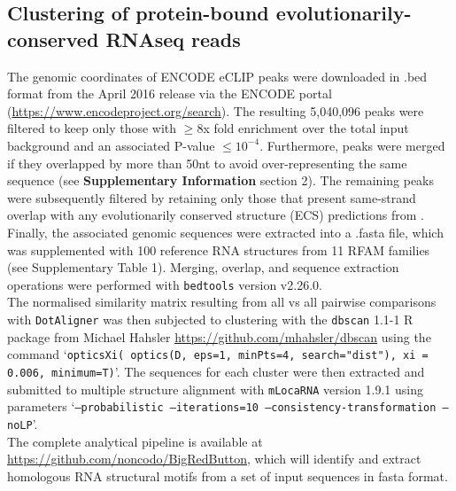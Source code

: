 \documentclass{bmcart}
\newcommand\dotaligner{\texttt{DotAligner}}
\begin{document}
\subsection*{Clustering of protein-bound evolutionarily-conserved RNAseq reads}

The genomic coordinates of ENCODE eCLIP peaks were downloaded in .bed format from the April 2016 release via the ENCODE portal (\url{https://www.encodeproject.org/search}). The resulting 5,040,096 peaks 
were filtered to keep only those with $\ge$8x fold enrichment over the total input background and an associated P-value  $\leq10^{-4}$. Furthermore, peaks were merged if they overlapped by more than 50nt to avoid over-representing the same sequence (see \textbf{Supplementary Information }section 2). The remaining peaks were subsequently filtered by 
retaining only those that present same-strand overlap with any evolutionarily conserved structure (ECS) predictions from \cite{smith2013widespread}. Finally, the associated genomic sequences were extracted into a .fasta file, which was supplemented with 100 reference RNA structures from 11 RFAM families (see Supplementary Table 1). 
Merging, overlap, and sequence extraction operations were performed with \texttt{bedtools} version v2.26.0. \\

The normalised similarity matrix resulting from all vs all pairwise comparisons with \dotaligner{} was then 
subjected to clustering with the \texttt{dbscan} 1.1-1 R package from Michael Hahsler
 \url{https://github.com/mhahsler/dbscan} using the command `\texttt{opticsXi( optics(D, eps=1, minPts=4, search="dist"), xi = 0.006, minimum=T)}'. The sequences for each cluster were then extracted and submitted to multiple structure alignment with \texttt{mLocaRNA} version 1.9.1 using parameters  `\texttt{--probabilistic --iterations=10  --consistency-transformation --noLP}'.\\
 
The complete analytical pipeline is available at \url{https://github.com/noncodo/BigRedButton},
which will identify and extract homologous RNA structural motifs from a set of 
input sequences in fasta format. \\



\end{document}
